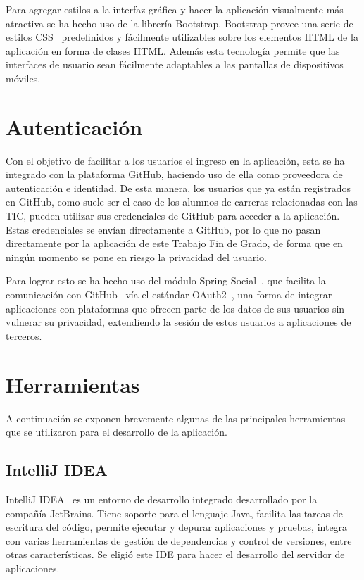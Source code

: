 \documentclass[a4paper, 12pt]{book}
\begin{document}
    Para agregar estilos a la interfaz gráfica y hacer la aplicación visualmente más atractiva se ha hecho uso
    de la librería Bootstrap\cite{bib:bootstrap}. Bootstrap provee una serie de estilos
    CSS~\cite{bib:css} predefinidos y fácilmente utilizables sobre los elementos HTML de la aplicación en forma de clases HTML.
    Además esta tecnología permite que las interfaces de usuario sean fácilmente adaptables a las pantallas de
    dispositivos móviles.


    \section{Autenticación}
    \label{sec:intro_authentication}

    Con el objetivo de facilitar a los usuarios el ingreso en la aplicación, esta se ha integrado con la plataforma GitHub, haciendo uso de ella como proveedora de autenticación e identidad. De esta manera, los usuarios que ya están registrados en GitHub, como suele ser el caso de los alumnos de carreras relacionadas con las TIC, pueden utilizar sus credenciales de GitHub para acceder a la aplicación. Estas credenciales se envían directamente a GitHub, por lo que no pasan directamente por la aplicación de este Trabajo Fin de Grado, de forma que en ningún momento se pone en riesgo la privacidad del usuario.

    Para lograr esto se ha hecho uso del módulo Spring Social~\cite{bib:springsocial}, que facilita la comunicación con GitHub~\cite{bib:github} vía el estándar OAuth2~\cite{bib:oauth2}, una forma de integrar aplicaciones con plataformas que ofrecen parte de los datos de sus usuarios sin vulnerar su privacidad, extendiendo la sesión de estos usuarios a aplicaciones de terceros.


    \section{Herramientas}
    \label{sec:intro_tools}
    A continuación se exponen brevemente algunas de las principales herramientas que se utilizaron para el desarrollo de la aplicación.

    \subsection{IntelliJ IDEA}
    \label{subsec:intro_tools_intellij}
    IntelliJ IDEA~\cite{bib:intellij} es un entorno de desarrollo integrado desarrollado por la compañía JetBrains. Tiene soporte para el lenguaje Java, facilita las tareas de escritura del código, permite ejecutar y depurar aplicaciones y pruebas, integra con varias herramientas de gestión de dependencias y control de versiones, entre otras características. Se eligió este IDE para hacer el desarrollo del servidor de aplicaciones.
\end{document}
